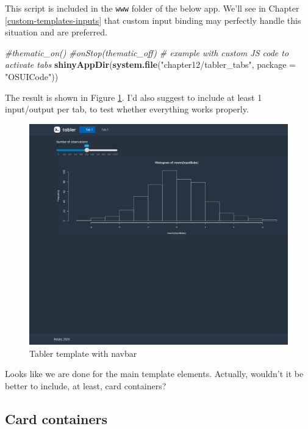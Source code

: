 \documentclass[
]{book}
\newenvironment{Shaded}{\begin{snugshade}}{\end{snugshade}}
\newcommand{\CommentTok}[1]{\textcolor[rgb]{0.56,0.35,0.01}{\textit{#1}}}
\newcommand{\DataTypeTok}[1]{\textcolor[rgb]{0.13,0.29,0.53}{#1}}
\newcommand{\KeywordTok}[1]{\textcolor[rgb]{0.13,0.29,0.53}{\textbf{#1}}}
\newcommand{\NormalTok}[1]{#1}
\newcommand{\StringTok}[1]{\textcolor[rgb]{0.31,0.60,0.02}{#1}}
\begin{document}
This script is included in the \texttt{www} folder of the below app. We'll see in Chapter \ref{custom-templates-inputs} that custom input binding may perfectly handle this situation and are preferred.

\begin{Shaded}
\begin{Highlighting}[]
\CommentTok{#thematic_on()}
\CommentTok{#onStop(thematic_off)}
\CommentTok{# example with custom JS code to activate tabs}
\KeywordTok{shinyAppDir}\NormalTok{(}\KeywordTok{system.file}\NormalTok{(}\StringTok{"chapter12/tabler_tabs"}\NormalTok{, }\DataTypeTok{package =} \StringTok{"OSUICode"}\NormalTok{))}
\end{Highlighting}
\end{Shaded}

The result is shown in Figure \ref{fig:tabler-nav}. I'd also suggest to include at least 1 input/output per tab, to test whether everything works properly.

\begin{figure}
\includegraphics[width=15.04in]{images/practice/tabler-nav} \caption{Tabler template with navbar}\label{fig:tabler-nav}
\end{figure}

Looks like we are done for the main template elements. Actually, wouldn't it be better to include, at least, card containers?

\hypertarget{card-containers}{%
\subsection{Card containers}\label{card-containers}}
\end{document}
